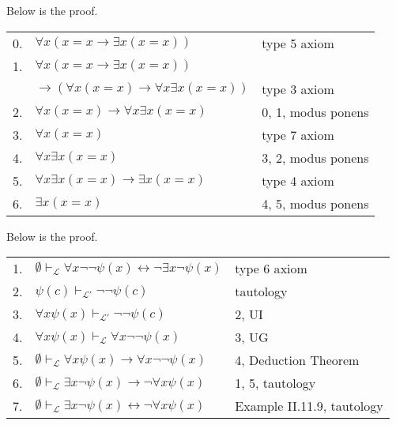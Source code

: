 \documentclass[12pt]{article}
\theoremstyle{definition}
\newenvironment{customthm}[1]
  {\renewcommand\theinnercustomthm{#1}\innercustomthm}
  {\endinnercustomthm}
\begin{document}
\begin{customthm}{II.10.6} Below is the proof.
\begin{flushleft}
\begin{tabular}{lll}
  0. & $\forall x(x=x\rightarrow\exists x(x=x))$ & type 5 axiom \\
  1. & $\forall x(x=x\rightarrow\exists x(x=x))$ & \\
  & $\rightarrow(\forall x(x=x)\rightarrow\forall x\exists x(x=x))$ & type 3 axiom \\
  2. & $\forall x(x=x)\rightarrow\forall x\exists x(x=x)$ & 0, 1, modus ponens \\
  3. & $\forall x(x=x)$ & type 7 axiom \\
  4. & $\forall x\exists x(x=x)$ & 3, 2, modus ponens \\
  5. & $\forall x\exists x(x=x)\rightarrow\exists x(x=x)$ & type 4 axiom \\
  6. & $\exists x(x=x)$ & 4, 5, modus ponens
\end{tabular}
\end{flushleft}
\end{customthm}

\begin{customthm}{II.11.10} Below is the proof.
\begin{flushleft}
\begin{tabular}{lll}
  1. & $\emptyset\vdash_\mathcal{L}\forall x\neg\neg\psi(x)\leftrightarrow\neg\exists x\neg\psi(x)$ & type 6 axiom \\
  2. & $\psi(c)\vdash_{\mathcal{L}'}\neg\neg\psi(c)$ & tautology \\
  3. & $\forall x\psi(x)\vdash_{\mathcal{L}'}\neg\neg\psi(c)$ & 2, UI \\
  4. & $\forall x\psi(x)\vdash_\mathcal{L}\forall x\neg\neg\psi(x)$ & 3, UG \\
  5. & $\emptyset\vdash_\mathcal{L}\forall x\psi(x)\rightarrow\forall x\neg\neg\psi(x)$ & 4, Deduction Theorem \\
  6. & $\emptyset\vdash_\mathcal{L}\exists x\neg\psi(x)\rightarrow\neg\forall x\psi(x)$ & 1, 5, tautology \\
  7. & $\emptyset\vdash_\mathcal{L}\exists x\neg\psi(x)\leftrightarrow\neg\forall x\psi(x)$ & Example II.11.9, tautology
\end{tabular}
\end{flushleft}
\end{customthm}
\end{document}
